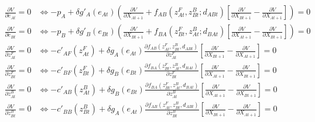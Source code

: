 \documentclass{article}
\begin{document}
\begin{align}
\frac{\partial V}{\partial e_{At}} =  0 &\iff - p_A + \delta g'_A(e_{At})\left( \frac{\partial V}{\partial X_{At+1}} + f_{AB}(z_{At}^F, z_{Bt}^B; d_{ABt})\left[\frac{\partial V}{\partial X_{Bt+1}} - \frac{\partial V}{\partial X_{At+1}} \right] \right)=0 \label{eq:foc_eat}\\
%
\frac{\partial V}{\partial e_{Bt}} =  0 &\iff - p_B + \delta g'_B(e_{Bt})\left( \frac{\partial V}{\partial X_{Bt+1}} + f_{BA}(z_{Bt}^F, z_{At}^B; d_{BAt})\left[\frac{\partial V}{\partial X_{At+1}} - \frac{\partial V}{\partial X_{Bt+1}} \right] \right) = 0 \label{eq:foc_ebt}\\
%
\frac{\partial V}{\partial z^F_{At}} = 0 &\iff -c'_{AF}(z_{At}^F) + \delta g_A(e_{At}) \frac{\partial f_{AB}(z_{At}^F, z_{Bt}^B, d_{ABt})}{\partial z_{At}^F} \left[\frac{\partial V}{\partial X_{Bt+1}} - \frac{\partial V}{\partial X_{At+1}}  \right] = 0\label{eq:foc_zfa}\\
%
\frac{\partial V}{\partial z^F_{Bt}} = 0 &\iff -c'_{BF}(z_{Bt}^F) + \delta g_B(e_{Bt}) \frac{\partial f_{BA}(z_{Bt}^F, z_{At}^B, d_{BAt})}{\partial z_{Bt}^F} \left[\frac{\partial V}{\partial X_{At+1}} - \frac{\partial V}{\partial X_{Bt+1}}  \right] = 0\label{eq:foc_zfb}\\
%
\frac{\partial V}{\partial z_{At}^B} = 0 &\iff - c'_{AB}(z_{At}^B) + \delta g_B(e_{Bt}) \frac{\partial f_{BA}(z_{Bt}^F, z_{At}^B, d_{BAt})}{\partial z_{At}^B} \left[ \frac{\partial V}{\partial X_{At+1}} - \frac{\partial V}{\partial X_{Bt+1}}\right] = 0 \label{eq:foc_zba}\\
%
\frac{\partial V}{\partial z_{Bt}^B} = 0 &\iff - c'_{BB}(z_{Bt}^B) + \delta g_A(e_{At}) \frac{\partial f_{AB}(z_{At}^F, z_{Bt}^B, d_{ABt})}{\partial z_{Bt}^B} \left[ \frac{\partial V}{\partial X_{Bt+1}} - \frac{\partial V}{\partial X_{At+1}}\right] = 0
\label{eq:foc_zbb}
\end{align}
\end{document}
